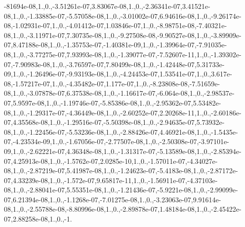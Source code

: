 {-81694e-\/08,1.,0.,-\/3.\-51261e-\/07,3.\-83067e-\/08,1.,0.,-\/2.\-36341e-\/07,3.\-41521e-\/08,1.,0.,-\/1.\-33885e-\/07,-\/5.\-57058e-\/08,1.,0.,-\/3.\-01002e-\/07,6.\-94616e-\/08,1.,0.,-\/9.\-26174e-\/08,-\/1.\-02931e-\/07,1.,0.,-\/4.\-01412e-\/07,1.\-03846e-\/07,1.,0.,-\/8.\-98751e-\/08,-\/7.\-40321e-\/08,1.,0.,-\/3.\-11971e-\/07,7.\-30735e-\/08,1.,0.,-\/9.\-27508e-\/08,-\/9.\-90527e-\/08,1.,0.,-\/3.\-89909e-\/07,8.\-47188e-\/08,1.,0.,-\/1.\-35753e-\/07,-\/1.\-40381e-\/09,1.,0.,-\/1.\-39964e-\/07,-\/7.\-91035e-\/08,1.,0.,-\/3.\-77275e-\/07,7.\-93993e-\/08,1.,0.,-\/1.\-39077e-\/07,-\/7.\-52607e-\/11,1.,0.,-\/1.\-39302e-\/07,-\/7.\-90983e-\/08,1.,0.,-\/3.\-76597e-\/07,7.\-80499e-\/08,1.,0.,-\/1.\-42448e-\/07,5.\-31733e-\/09,1.,0.,-\/1.\-26496e-\/07,-\/9.\-93193e-\/08,1.,0.,-\/4.\-24453e-\/07,1.\-53541e-\/07,1.,0.,3.\-617e-\/08,-\/1.\-57217e-\/07,1.,0.,-\/4.\-35482e-\/07,1.\-177e-\/07,1.,0.,-\/8.\-23808e-\/08,-\/7.\-51659e-\/08,1.,0.,-\/3.\-07878e-\/07,6.\-37538e-\/08,1.,0.,-\/1.\-16617e-\/07,-\/6.\-064e-\/08,1.,0.,-\/2.\-98537e-\/07,5.\-9597e-\/08,1.,0.,-\/1.\-19746e-\/07,-\/5.\-85386e-\/08,1.,0.,-\/2.\-95362e-\/07,5.\-53482e-\/08,1.,0.,-\/1.\-29317e-\/07,-\/4.\-36449e-\/08,1.,0.,-\/2.\-60252e-\/07,2.\-20268e-\/11,1.,0.,-\/2.\-60186e-\/07,4.\-35568e-\/08,1.,0.,-\/1.\-29516e-\/07,-\/5.\-50398e-\/08,1.,0.,-\/2.\-94635e-\/07,5.\-73932e-\/08,1.,0.,-\/1.\-22456e-\/07,-\/5.\-53236e-\/08,1.,0.,-\/2.\-88426e-\/07,4.\-46921e-\/08,1.,0.,-\/1.\-5435e-\/07,-\/4.\-23534e-\/09,1.,0.,-\/1.\-67056e-\/07,-\/2.\-77507e-\/08,1.,0.,-\/2.\-50308e-\/07,-\/3.\-97101e-\/09,1.,0.,-\/2.\-62221e-\/07,4.\-36348e-\/08,1.,0.,-\/1.\-31317e-\/07,-\/5.\-13589e-\/08,1.,0.,-\/2.\-85394e-\/07,4.\-25913e-\/08,1.,0.,-\/1.\-5762e-\/07,2.\-0285e-\/10,1.,0.,-\/1.\-57011e-\/07,-\/4.\-34027e-\/08,1.,0.,-\/2.\-87219e-\/07,5.\-41987e-\/08,1.,0.,-\/1.\-24623e-\/07,-\/5.\-4183e-\/08,1.,0.,-\/2.\-87172e-\/07,4.\-33239e-\/08,1.,0.,-\/1.\-572e-\/07,9.\-65817e-\/11,1.,0.,-\/1.\-56911e-\/07,-\/4.\-37103e-\/08,1.,0.,-\/2.\-88041e-\/07,5.\-55351e-\/08,1.,0.,-\/1.\-21436e-\/07,-\/5.\-9221e-\/08,1.,0.,-\/2.\-99099e-\/07,6.\-21394e-\/08,1.,0.,-\/1.\-1268e-\/07,-\/7.\-01275e-\/08,1.,0.,-\/3.\-23063e-\/07,9.\-91614e-\/08,1.,0.,-\/2.\-55788e-\/08,-\/8.\-80996e-\/08,1.,0.,-\/2.\-89878e-\/07,1.\-48184e-\/08,1.,0.,-\/2.\-45422e-\/07,2.\-88258e-\/08,1.,0.,-\/1.}
